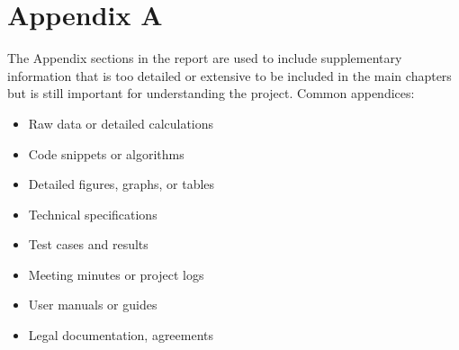 \chapter*{Appendix A} 
The Appendix sections in the report are used to include supplementary information that is too detailed or extensive to be included in the main chapters but is still important for understanding the project. \vspace{0.5cm} Common appendices: \begin{itemize} \item Raw data or detailed calculations \item Code snippets or algorithms \item Detailed figures, graphs, or tables \item Technical specifications \item Test cases and results \item Meeting minutes or project logs \item User manuals or guides \item Legal documentation, agreements \end{itemize}